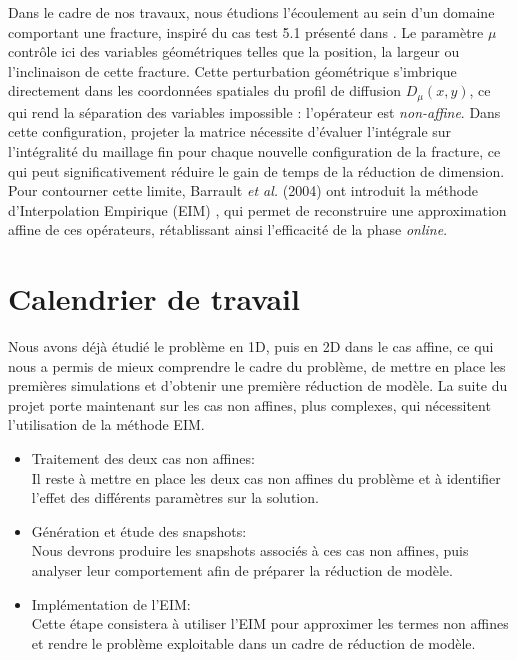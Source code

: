 \documentclass[12pt,a4paper]{article}
\begin{document}
Dans le cadre de nos travaux, nous étudions l'écoulement au sein d'un domaine comportant une fracture, inspiré du cas test 5.1 présenté dans \cite{arxiv_fracture}. Le paramètre $\mu$ contrôle ici des variables géométriques telles que la position, la largeur ou l'inclinaison de cette fracture. Cette perturbation géométrique s'imbrique directement dans les coordonnées spatiales du profil de diffusion $D_\mu(x,y)$, ce qui rend la séparation des variables impossible : l'opérateur est \textit{non-affine}. Dans cette configuration, projeter la matrice nécessite d'évaluer l'intégrale sur l'intégralité du maillage fin pour chaque nouvelle configuration de la fracture, ce qui peut significativement réduire le gain de temps de la réduction de dimension. Pour contourner cette limite, Barrault \textit{et al.} (2004) ont introduit la méthode d'Interpolation Empirique (EIM) \cite{barrault2004}, qui permet de reconstruire une approximation affine de ces opérateurs, rétablissant ainsi l'efficacité de la phase \textit{online}.

\section{Calendrier de travail}

Nous avons déjà étudié le problème en 1D, puis en 2D dans le cas affine, ce qui nous a permis de mieux comprendre le cadre du problème, de mettre en place les premières simulations et d’obtenir une première réduction de modèle. La suite du projet porte maintenant sur les cas non affines, plus complexes, qui nécessitent l’utilisation de la méthode EIM.

\begin{itemize}
    \item Traitement des deux cas non affines: \\
    Il reste à mettre en place les deux cas non affines du problème et à identifier l’effet des différents paramètres sur la solution.

    \item Génération et étude des snapshots: \\
    Nous devrons produire les snapshots associés à ces cas non affines, puis analyser leur comportement afin de préparer la réduction de modèle.

    \item Implémentation de l’EIM: \\
    Cette étape consistera à utiliser l’EIM pour approximer les termes non affines et rendre le problème exploitable dans un cadre de réduction de modèle.

\end{itemize}
\end{document}
